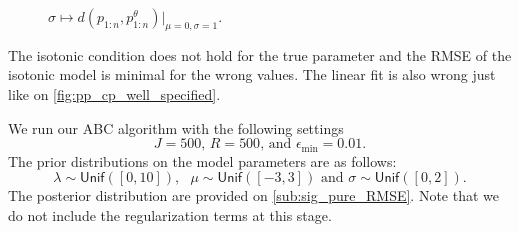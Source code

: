 \documentclass[10pt]{article}
\newcommand*{\UnifDist}{\mathsf{Unif}}
\begin{document}
\begin{figure}[!ht]
  \begin{center}
    \caption{$\sigma\mapsto d\left(p_{1:n},p_{1:n}^{\theta}\right)\Big\rvert_{\mu =0, \sigma = 1}$.}
    \label{fig:rmse_sigma_iso_linear_miss}
  \end{center}
\end{figure}

The isotonic condition does not hold for the true parameter and the RMSE of the isotonic model is minimal for the wrong values. The linear fit is also wrong just like on \cref{fig:pp_cp_well_specified}. 

We run our ABC algorithm with the following settings 
$$
J = 500\text{, }R= 500\text{, and }\epsilon_{\min} =0.01.
$$
The prior distributions on the model parameters are as follows: 
$$
\lambda \sim \UnifDist([0, 10]),\text{ }\mu\sim \UnifDist([-3, 3])\text{ and }\sigma\sim \UnifDist([0, 2]).
$$
The posterior distribution are provided on \cref{sub:sig_pure_RMSE}. Note that we do not include the regularization terms at this stage.
\end{document}
